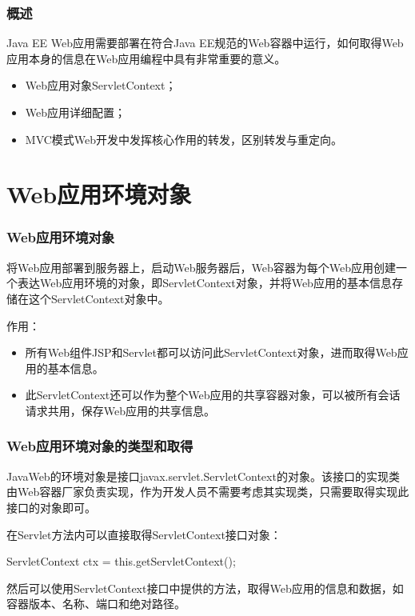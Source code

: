 \begin{frame}
\frametitle{概述} 

Java EE Web应用需要部署在符合Java EE规范的Web容器中运行，如何取得Web应用本身的信息在Web应用编程中具有非常重要的意义。

\begin{itemize}
\item Web应用对象ServletContext；
\item Web应用详细配置；
\item MVC模式Web开发中发挥核心作用的转发，区别{\hei 转发}与{\hei 重定向}。
\end{itemize}
\end{frame}

\section{Web应用环境对象}

\begin{frame}[fragile] %
\frametitle{Web应用环境对象} 

将Web应用部署到服务器上，启动Web服务器后，Web容器为每个Web应用创建一个表达Web应用环境的对象，即ServletContext对象，并将Web应用的基本信息存储在这个ServletContext对象中。

{\hei 作用：}

\begin{itemize}\kai
\item 所有Web组件JSP和Servlet都可以访问此ServletContext对象，进而取得Web应用的基本信息。
\item 此ServletContext还可以作为整个Web应用的共享容器对象，可以被所有会话请求共用，保存Web应用的共享信息。
\end{itemize}
\end{frame}

\begin{frame}[fragile] %
\frametitle{Web应用环境对象的类型和取得} 

JavaWeb的环境对象是接口javax.servlet.ServletContext的对象。该接口的实现类由Web容器厂家负责实现，作为开发人员不需要考虑其实现类，只需要取得实现此接口的对象即可。

在Servlet方法内可以直接取得ServletContext接口对象：

\begin{javaCode}
ServletContext ctx = this.getServletContext();
\end{javaCode}

然后可以使用ServletContext接口中提供的方法，取得Web应用的信息和数据，如容器版本、名称、端口和绝对路径。
\end{frame}


